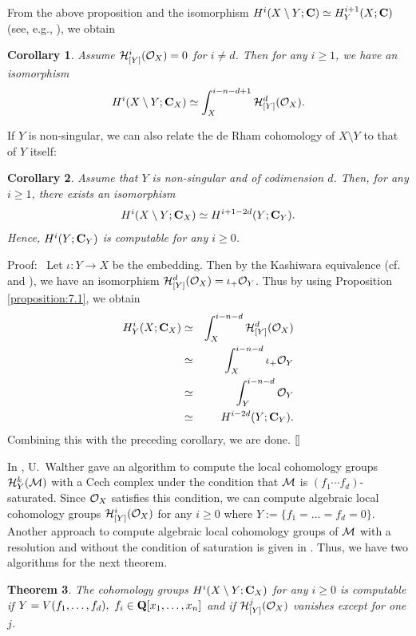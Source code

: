\documentclass[12pt]{article}
\def\C{{\bf C}}
\def\Q{{\bf Q}}
\def\Hsc{ {\cal H} }
\def\Msc{ {\cal M} }
\def\Osc{ {\cal O} }
\newenvironment{proof}{\par\noindent Proof:\ }{${\tt [}\kern-0.2mm{\tt ]}$}
\newtheorem{theorem}{Theorem}[section]
\newtheorem{corollary}[theorem]{Corollary}
\begin{document}
  From the above proposition and the isomorphism 
$H^i(X\setminus Y; \C) \simeq H^{i+1}_Y(X; \C)$
(see, e.g., \cite[p.212, exercises 2.3]{HartshornBook}), we obtain 

\begin{corollary}
Assume $\Hsc_{[Y]}^i(\Osc_X)=0$ for $i \neq d$.
Then for any $i \geq 1$, we have an isomorphism
$$
H^i(X\setminus Y; \C_X) \simeq \int_X^{i-n-d+1}\Hsc^d_{[Y]}(\Osc_X).
$$
\end{corollary}

If $Y$ is non-singular, we can also relate the de Rham cohomology of 
$X\setminus Y$ to that of $Y$ itself:

\begin{corollary}
Assume that $Y$ is non-singular and of codimension $d$.  
Then, for any $i\geq 1$, there exists an isomorphism
$$
H^i(X\setminus Y; \C_X) \simeq H^{i+1-2d}(Y; \C_Y).
$$
Hence, $H^i(Y; \C_Y)$ is computable for any $i \geq 0$.
\end{corollary}

\begin{proof}
Let $\iota : Y \rightarrow X$ be the embedding.
Then by the Kashiwara equivalence 
(cf.\  \cite[p.34, Theorem 1.6.1]{HottaTanisaki} and \cite{K1}), 
we have an isomorphism
$\Hsc^d_{[Y]}(\Osc_X) = \iota_+\Osc_Y$.
Thus by using Proposition \ref{proposition:7.1}, we obtain
\begin{eqnarray*}
H_Y^i(X; \C_X) &\simeq& \int_X^{i-n-d}\Hsc^d_{[Y]}(\Osc_X)\\
&\simeq& \int_X^{i-n-d}\iota_+\Osc_Y\\
&\simeq& \int_Y^{i-n-d}\Osc_Y\\
&\simeq& H^{i-2d}(Y; \C_Y).
\end{eqnarray*}
Combining this with the preceding corollary, we are done.
\end{proof}

In \cite{Walther}, U.~Walther gave an algorithm to 
compute the local cohomology groups $\Hsc^k_{Y}(\Msc)$
with a Cech complex under the condition that
$\Msc$ is $(f_1 \cdots f_d)$-saturated.
Since $\Osc_X$ satisfies this condition,
we can compute
algebraic local cohomology groups $\Hsc_{[Y]}^i(\Osc_X)$ for any 
$i \geq 0$  where $Y := \{f_1 = \dots = f_d = 0\}$.
Another approach to compute algebraic local cohomology groups
of $\Msc$  with a resolution and 
without the condition of saturation is given in
\cite{OakuAdvance2}.
Thus, we have two algorithms for the next theorem.


\begin{theorem}
The cohomology groups $H^i(X\setminus Y; \C_X)$ for any $i\geq 0$ 
is computable
if $ Y = V(f_1, \ldots, f_d),\  f_i \in \Q[x_1, \ldots, x_n]$ 
and if
$\Hsc_{[Y]}^j(\Osc_X)$ vanishes except for one $j$.
\end{theorem}
\end{document}
